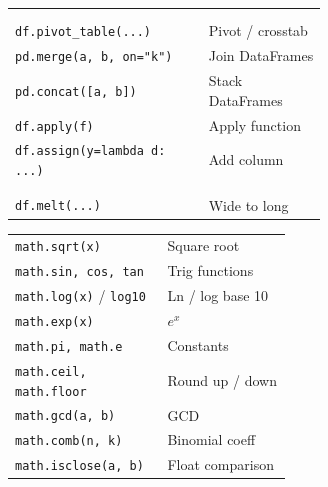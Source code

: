 \documentclass[10pt]{extarticle}
\begin{document}
\begin{multicols}{2}
\begin{tabularx}{\linewidth}{@{}>{\raggedright\arraybackslash}p{0.62\linewidth}@{\enspace}Y@{}}
 & \\
 \\
\texttt{df.pivot\_table(...)}        & Pivot / crosstab \\
\texttt{pd.merge(a, b, on="k")}     & Join DataFrames \\
\texttt{pd.concat([a, b])}          & Stack DataFrames \\
\texttt{df.apply(f)}                 & Apply function \\
\texttt{df.assign(y=lambda d: ...)} & Add column \\
 & \\
 \\
\texttt{df.melt(...)}                & Wide to long \\
\end{tabularx}

\begin{tabularx}{\linewidth}{@{}>{\raggedright\arraybackslash}p{0.55\linewidth}@{\enspace}Y@{}}
\texttt{math.sqrt(x)}               & Square root \\
\texttt{math.sin, cos, tan}         & Trig functions \\
\texttt{math.log(x)} / \texttt{log10}  & Ln / log base 10 \\
\texttt{math.exp(x)}                & $e^x$ \\
\texttt{math.pi, math.e}            & Constants \\
\texttt{math.ceil, math.floor}      & Round up / down \\
\texttt{math.gcd(a, b)}             & GCD \\
\texttt{math.comb(n, k)}            & Binomial coeff \\
\texttt{math.isclose(a, b)}         & Float comparison \\
\end{tabularx}


\end{multicols}
\end{document}
